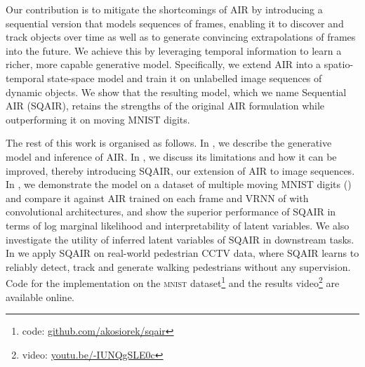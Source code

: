 Our contribution is to mitigate the shortcomings of  \gls{AIR} by introducing a sequential version that models sequences of frames, enabling it to discover and track objects over time as well as to generate convincing extrapolations of frames into the future. We achieve this by leveraging temporal information to learn a richer, more capable generative model. Specifically, we extend \gls{AIR} into a spatio-temporal state-space model and train it on unlabelled image sequences of dynamic objects. 
We show that the resulting model, which we name Sequential \gls{AIR} (\acrshort{SQAIR}), retains the strengths of the original AIR formulation while outperforming it on moving \gls{MNIST} digits.

The rest of this work is organised as follows.
In , we describe the generative model and inference of \gls{AIR}.
In , we discuss its limitations and how it can be improved, thereby introducing \gls{SQAIR}, our extension of \gls{AIR} to image sequences.
In , we demonstrate the model on a dataset of multiple moving MNIST digits () and compare it against \gls{AIR} trained on each frame and \gls{VRNN} of \cite{Chung2015} with convolutional architectures, and show the superior performance of \gls{SQAIR} in terms of log marginal likelihood and interpretability of latent variables.
We also investigate the utility of inferred latent variables of \gls{SQAIR} in downstream tasks.
In  we apply \gls{SQAIR} on real-world pedestrian CCTV data, where \gls{SQAIR} learns to reliably detect, track and generate walking pedestrians without any supervision.
Code for the implementation on the \textsc{mnist} dataset\footnote{code: \href{https://github.com/akosiorek/sqair}{github.com/akosiorek/sqair}} and the results video\footnote{video: \href{https://youtu.be/-IUNQgSLE0c}{youtu.be/-IUNQgSLE0c}} are available online.